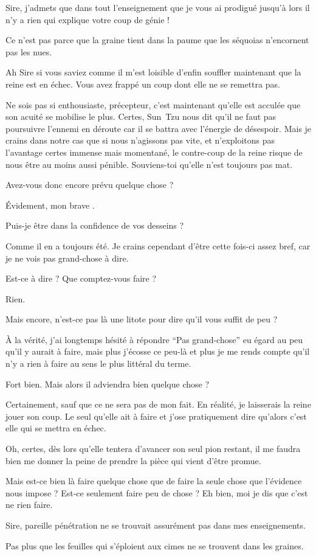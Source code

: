 \begin{drama}
  \alexasspeaks Sire, j’admets que dans tout l’enseignement que je vous ai prodigué jusqu’à lors il n’y a rien qui explique votre coup de génie !

  \elenaspeaks Ce n’est pas parce que la graine tient dans la paume que les séquoias n’encornent pas les nues.

  \alexasspeaks Ah Sire si vous saviez comme il m’est loisible d’enfin souffler maintenant que la reine est en échec. Vous avez frappé un coup dont elle ne se remettra pas.

  \elenaspeaks Ne sois pas si enthousiaste, précepteur, c’est maintenant qu’elle est acculée que son acuité se mobilise le plus. Certes, Sun~Tzu nous dit qu’il ne faut pas poursuivre l’ennemi en déroute car il se battra avec l’énergie de désespoir. Mais je crains dans notre cas que si nous n’agissons pas vite, et n’exploitons pas l’avantage certes immense mais momentané, le contre-coup de la reine risque de nous être au moins aussi pénible. Souviens-toi qu’elle n’est toujours pas mat.

  \alexasspeaks Avez-vous donc encore prévu quelque chose ?

  \elenaspeaks Évidement, mon brave \alexas.

  \alexasspeaks Puis-je être dans la confidence de vos desseins ?

  \elenaspeaks Comme il en a toujours été. Je crains cependant d’être cette fois-ci assez bref, car je ne vois pas grand-chose à dire.

  \alexasspeaks Est-ce à dire ? Que comptez-vous faire ?

  \elenaspeaks Rien.

  \alexasspeaks Mais encore, n’est-ce pas là une litote pour dire qu’il vous suffit de peu ?

  \elenaspeaks À la vérité, j’ai longtemps hésité à répondre \enquote{Pas grand-chose} eu égard au peu qu’il y aurait à faire, mais plus j’écosse ce peu-là et plus je me rends compte qu’il n’y a rien à faire au sens le plus littéral du terme.

  \alexasspeaks Fort bien. Mais alors il adviendra bien quelque chose ?

  \elenaspeaks Certainement, sauf que ce ne sera pas de mon fait. En réalité, je laisserais la reine jouer son coup. Le seul qu’elle ait à faire et j’ose pratiquement dire qu’alors c’est elle qui se mettra en échec.

  Oh, certes, dès lors qu’elle tentera d’avancer son seul pion restant, il me faudra bien me donner la peine de prendre la pièce qui vient d’être promue.

  Mais est-ce bien là faire quelque chose que de faire la seule chose que l’évidence nous impose ? Est-ce seulement faire peu de chose ? Eh bien, moi je dis que c’est ne rien faire.

  \alexasspeaks Sire, pareille pénétration ne se trouvait assurément pas dans mes enseignements.

  \elenaspeaks Pas plus que les feuilles qui s’éploient aux cimes ne se trouvent dans les graines.

\end{drama}

